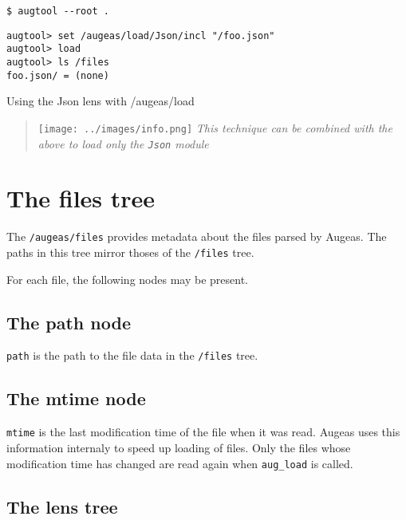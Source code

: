    

\begin{listing}
  \begin{verbatim}
$ augtool --root .
  \end{verbatim}
  \begin{verbatim}
augtool> set /augeas/load/Json/incl "/foo.json"
augtool> load
augtool> ls /files
foo.json/ = (none)
  \end{verbatim}
  \caption{Using the Json lens with /augeas/load}
  \label{lst:metadata_json_lens}
\end{listing}

\begin{quote}
\texttt{[image: ../images/info.png]} \emph{This technique can be combined with the above to load only the \texttt{Json} module}

\end{quote}
\section{The files tree}


The \verb!/augeas/files! provides metadata about the files parsed by Augeas. The paths in this tree mirror thoses of the \verb!/files! tree.

For each file, the following nodes may be present.

\subsection{The path node}

\verb!path! is the path to the file data in the \verb!/files! tree.

\subsection{The mtime node}

\verb!mtime! is the last modification time of the file when it was read. Augeas uses this information internaly to speed up loading of files. Only the files whose modification time has changed are read again when \verb!aug_load! is called.

\subsection{The lens tree}

